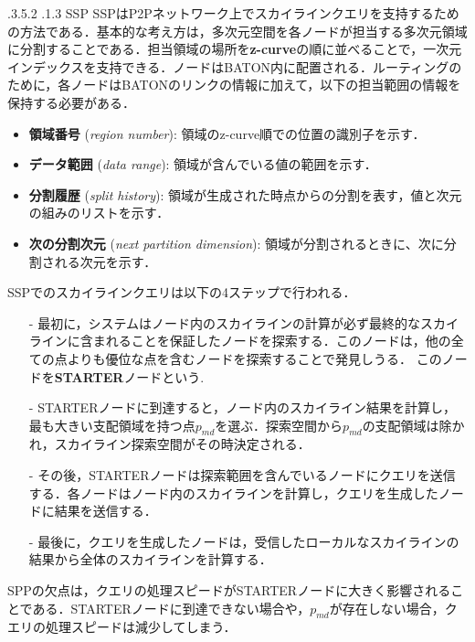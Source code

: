 \documentclass{jarticle}
\makeatletter
\renewcommand{\subsubsection}{\@startsection{subsubsection}{3}{\z@}%
   {.3\Cvs \@plus.5\Cvs \@minus.2\Cvs}%
   {.1\Cvs \@plus.3\Cvs}%
   {\reset@font\normalsize\bfseries}}
\makeatother
\begin{document}
{\subsubsection{SSP}
SSPはP2Pネットワーク上でスカイラインクエリを支持するための方法である．基本的な考え方は，多次元空間を各ノードが担当する多次元領域に分割することである．担当領域の場所を\textbf{z-curve}の順に並べることで，一次元インデックスを支持できる．ノードはBATON内に配置される．ルーティングのために，各ノードはBATONのリンクの情報に加えて，以下の担当範囲の情報を保持する必要がある．
\begin{itemize}
  \item\textbf{領域番号} (\textit{region number}): 領域のz-curve順での位置の識別子を示す．
  \item\textbf{データ範囲} (\textit{data range}): 領域が含んでいる値の範囲を示す．
  \item\textbf{分割履歴} (\textit{split history}): 領域が生成された時点からの分割を表す，値と次元の組みのリストを示す．
  \item\textbf{次の分割次元} (\textit{next partition dimension}): 領域が分割されるときに、次に分割される次元を示す．
\end{itemize}
SSPでのスカイラインクエリは以下の4ステップで行われる．
\begin{itemize}
  \item[-]最初に，システムはノード内のスカイラインの計算が必ず最終的なスカイラインに含まれることを保証したノードを探索する．このノードは，他の全ての点よりも優位な点を含むノードを探索することで発見しうる．
  このノードを\textbf{STARTER}ノードという.
  \item[-]STARTERノードに到達すると，ノード内のスカイライン結果を計算し，最も大きい支配領域を持つ点$p_{md}$を選ぶ．探索空間から$p_{md}$の支配領域は除かれ，スカイライン探索空間がその時決定される．
  \item[-]その後，STARTERノードは探索範囲を含んでいるノードにクエリを送信する．各ノードはノード内のスカイラインを計算し，クエリを生成したノードに結果を送信する．
  \item[-]最後に，クエリを生成したノードは，受信したローカルなスカイラインの結果から全体のスカイラインを計算する．
\end{itemize}
SPPの欠点は，クエリの処理スピードがSTARTERノードに大きく影響されることである．STARTERノードに到達できない場合や，$p_{md}$が存在しない場合，クエリの処理スピードは減少してしまう．

}
\end{document}
